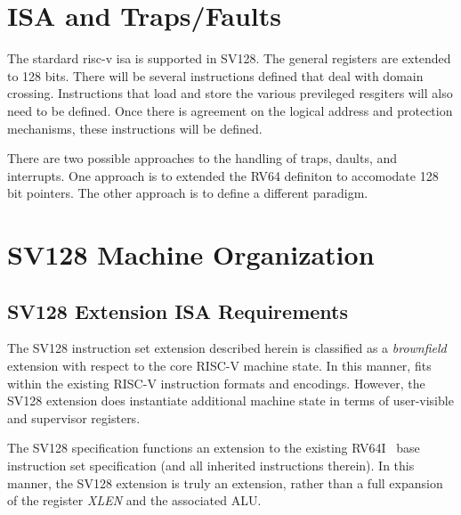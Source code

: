\documentclass{article}
\begin{document}
\section{ISA and Traps/Faults}

The stardard risc-v isa is supported in SV128.  The  general registers are extended to 128 bits. There will be several instructions defined that deal with domain crossing.  Instructions that load and store the various previleged resgiters will also  need to be defined.  Once there is agreement on the logical address and  protection mechanisms,  these instructions will be defined.

There are two possible approaches to the handling of traps, daults,  and interrupts.  One approach is to extended the RV64 definiton to  accomodate 128 bit pointers.  The other approach is to define a  different paradigm.











\clearpage
\section{SV128 Machine Organization}
\label{sec:SV128MachineOrganization}

\subsection{SV128 Extension ISA Requirements}

The SV128 instruction set extension described herein is classified 
as a \textit{brownfield} extension with respect to the core RISC-V 
machine state.  In this manner, fits within the existing RISC-V instruction 
formats and encodings.  However, the SV128 extension does instantiate 
additional machine state in terms of user-visible and supervisor registers.

The SV128 specification functions an extension to the existing RV64I~\cite{RVSpec} 
base instruction set specification (and all inherited instructions therein).  In this 
manner, the SV128 extension is truly an extension, rather than a full expansion 
of the register \textit{XLEN} and the associated ALU.
\end{document}
